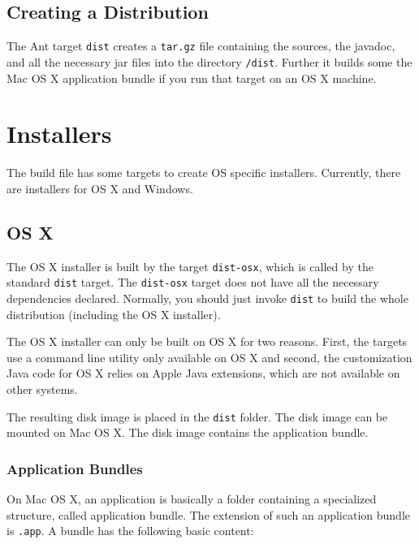 \documentclass[11pt,a4paper]{article}
\begin{document}
\subsection{Creating a Distribution}
The Ant target \texttt{dist} creates a \texttt{tar.gz} file containing the
sources, the javadoc, and all the necessary jar files into the directory
\texttt{/dist}. Further it builds some the Mac OS X application bundle if
you run that target on an OS X machine.



\section{Installers}
The build file has some targets to create OS specific installers. Currently,
there are installers for OS X and Windows.


\subsection{OS X}
The OS X installer is built by the target \texttt{dist-osx}, which is 
called by the standard \texttt{dist} target. The \texttt{dist-osx} target
does not have all the necessary dependencies declared. Normally, you should
just invoke \texttt{dist} to build the whole distribution (including
the OS X installer). 

The OS X installer can only
be built on OS X for two reasons. First, the targets use a command line
utility only available on OS X and second, the customization Java code
for OS X relies on Apple Java extensions, which are not available on
other systems.

The resulting disk image is placed in the \texttt{dist} folder. The disk
image can be mounted on Mac OS X. The disk image contains
the application bundle.

\subsubsection{Application Bundles}
On Mac OS X, an application is basically a folder containing a specialized
structure, called application bundle. The extension of such an application
bundle is \texttt{.app}. A bundle has the following basic content:
\end{document}
